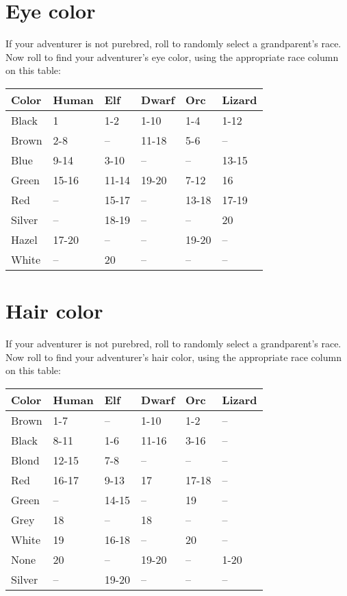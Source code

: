 \begin{multicols*}{2}
\section{Eye color}
If your adventurer is not purebred, roll  to randomly select a grandparent's race. Now roll  to find your adventurer's eye color, using the appropriate race column on this table:

\begin{normbox}
\begin{tabular}{l l l l l l}
Color & Human & Elf & Dwarf & Orc & Lizard\\
\midrule
Black & 1 & 1-2 & 1-10 & 1-4 & 1-12\\
Brown & 2-8 & -- & 11-18 & 5-6 & --\\
Blue & 9-14 & 3-10 & -- & -- & 13-15\\
Green & 15-16 & 11-14 & 19-20 & 7-12 & 16\\
Red & -- & 15-17 & -- & 13-18 & 17-19\\
Silver & -- & 18-19 & -- & -- & 20\\
Hazel & 17-20 & -- & -- & 19-20 & --\\
White & -- & 20 & -- & -- & --
\end{tabular}
\end{normbox}
\section{Hair color}

If your adventurer is not purebred, roll  to randomly select a grandparent's race. Now roll  to find your adventurer's hair color, using the appropriate race column on this table:
\begin{normbox}
\begin{tabular}{l l l l l l}
Color & Human & Elf & Dwarf & Orc & Lizard\\
\midrule

Brown & 1-7 & -- & 1-10 & 1-2 & --\\
Black & 8-11 & 1-6 & 11-16 & 3-16 & --\\
Blond & 12-15 & 7-8 & -- & -- & --\\
Red & 16-17 & 9-13 & 17 & 17-18 & --\\
Green & -- & 14-15 & -- & 19 & --\\
Grey & 18 & -- & 18 & -- & --\\
White & 19 & 16-18 & -- & 20 & --\\
None & 20 & -- & 19-20 & -- & 1-20\\
Silver & -- & 19-20 & -- & -- & --
\end{tabular}
\end{normbox}

\end{multicols*}
